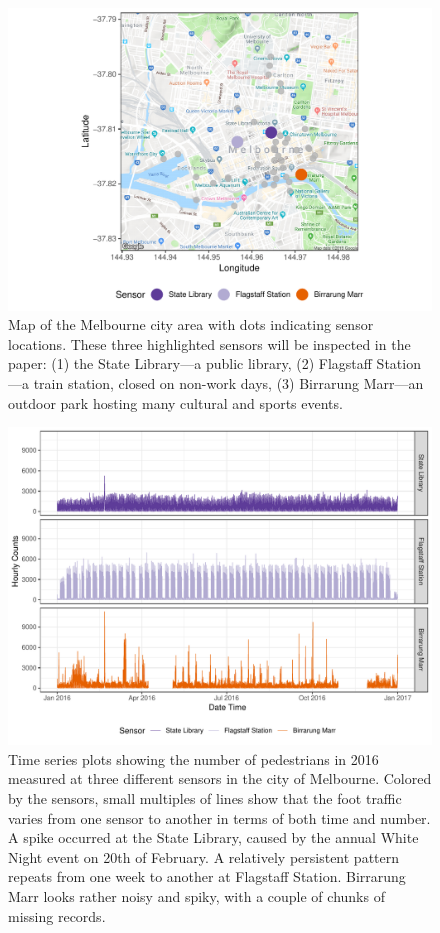 \documentclass[12pt]{article}
\begin{document}
\begin{figure}

{\centering \includegraphics[width=0.7\linewidth]{figure/ped-map-1} 

}

\caption{Map of the Melbourne city area with dots indicating sensor locations. These three highlighted sensors will be inspected in the paper: (1) the State Library---a public library, (2) Flagstaff Station---a train station, closed on non-work days, (3) Birrarung Marr---an outdoor park hosting many cultural and sports events.}\label{fig:ped-map}
\end{figure}



\begin{figure}

{\centering \includegraphics[width=\textwidth]{figure/time-series-plot-1} 

}

\caption{Time series plots showing the number of pedestrians in 2016 measured at three different sensors in the city of Melbourne. Colored by the sensors, small multiples of lines show that the foot traffic varies from one sensor to another in terms of both time and number. A spike occurred at the State Library, caused by the annual White Night event on 20th of February. A relatively persistent pattern repeats from one week to another at Flagstaff Station. Birrarung Marr looks rather noisy and spiky, with a couple of chunks of missing records.}\label{fig:time-series-plot}
\end{figure}
\end{document}
